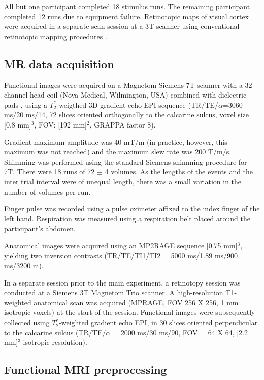 \documentclass[9pt,lineno]{aperture}
\begin{document}
All but one participant completed 18 stimulus runs. The remaining participant completed 12 runs due to equipment failure.
Retinotopic maps of visual cortex were acquired in a separate scan session at a 3T scanner using conventional retinotopic mapping procedures \citep{Sereno1995,DeYoe1996,Engel1997}.

\subsection{MR data acquisition}
Functional images were acquired on a Magnetom Siemens 7T scanner with a 32-channel head coil (Nova Medical, Wilmington, USA) combined with dielectric pads \citep{Teeuwisse2012}, using a $T_2^*$-weigthed 3D gradient-echo EPI sequence \citep{Poser2010} (TR/TE/$\alpha$=3060 ms/20 ms/14\textdegree, 72 slices oriented orthogonally to the calcarine sulcus, voxel size [0.8 mm]$^3$, FOV: [192 mm]$^2$, GRAPPA factor 8).

Gradient maximum amplitude was 40 mT/m (in practice, however, this maximum was not reached) and the maximum slew rate was 200 T/m/s. Shimming was performed using the standard Siemens shimming procedure for 7T. There were 18 runs of 72 $\pm$ 4 volumes. As the lengths of the events and the inter trial interval were of unequal length, there was a small variation in the number of volumes per run.

Finger pulse was recorded using a pulse oximeter affixed to the index finger of the left hand. Respiration was measured using a respiration belt placed around the participant's abdomen.

Anatomical images were acquired using an MP2RAGE sequence \citep{Marques2010} [0.75 mm]$^3$, yielding two inversion contrasts (TR/TE/TI1/TI2 = 5000 ms/1.89 ms/900 ms/3200 m).

In a separate session prior to the main experiment, a retinotopy session was conducted at a Siemens 3T Magnetom Trio scanner. A high-resolution T1-weighted anatomical scan was acquired (MPRAGE, FOV 256 X 256, 1 mm isotropic voxels) at the start of the session. Functional images were subsequently collected using $T_2^*$-weighted gradient echo EPI, in 30 slices oriented perpendicular to the calcarine sulcus (TR/TE/$\alpha$ = 2000 ms/30 ms/90\textdegree, FOV = 64 X 64, [2.2 mm]$^3$ isotropic resolution).

\subsection{Functional MRI preprocessing}
\end{document}
